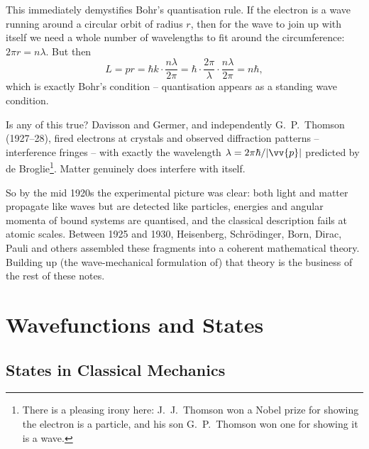 This immediately demystifies Bohr's quantisation rule. If the electron is a wave running around a circular orbit of radius $r$, then for the wave to join up with itself we need a whole number of wavelengths to fit around the circumference: $2 \pi r = n \lambda$. But then
$$
L = p r = \hbar k \cdot \frac{n \lambda}{2 \pi} = \hbar \cdot \frac{2 \pi}{\lambda} \cdot \frac{n \lambda}{2 \pi} = n \hbar,
$$
which is exactly Bohr's condition -- quantisation appears as a standing wave condition.

\begin{center}
\end{center}

Is any of this true? Davisson and Germer, and independently G.\ P.\ Thomson (1927--28), fired electrons at crystals and observed diffraction patterns -- interference fringes -- with exactly the wavelength $\lambda = 2 \pi \hbar / |\vv{p}|$ predicted by de Broglie\footnote{There is a pleasing irony here: J.\ J.\ Thomson won a Nobel prize for showing the electron is a particle, and his son G.\ P.\ Thomson won one for showing it is a wave.}. Matter genuinely does interfere with itself.

So by the mid 1920s the experimental picture was clear: both light and matter propagate like waves but are detected like particles, energies and angular momenta of bound systems are quantised, and the classical description fails at atomic scales. Between 1925 and 1930, Heisenberg, Schr\"odinger, Born, Dirac, Pauli and others assembled these fragments into a coherent mathematical theory. Building up (the wave-mechanical formulation of) that theory is the business of the rest of these notes.

\section{Wavefunctions and States}

\subsection{States in Classical Mechanics}

